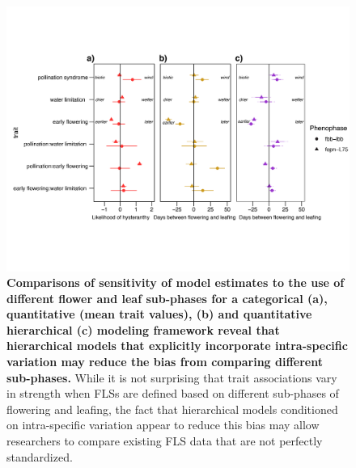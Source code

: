 \documentclass[11pt]{article}
\begin{document}
\begin{figure}[H]
\centering
\includegraphics[width=\textwidth]{..//..//HFmodelplots4SUPP-01.png} 
  \caption{\textbf{Comparisons of sensitivity of model estimates to the use of different flower and leaf sub-phases for a categorical  \textbf{(a)}, quantitative (mean trait values), \textbf{(b)} and quantitative hierarchical \textbf{(c)} modeling framework reveal that hierarchical models that explicitly incorporate intra-specific variation may reduce the bias from comparing different sub-phases.} While it is not surprising that trait associations vary in strength when FLSs are defined based on different sub-phases of flowering and leafing, the fact that hierarchical models conditioned on intra-specific variation appear to reduce this bias may allow researchers to compare existing FLS data that are not perfectly standardized.}
    \label{fig:sensitivity}
    \end{figure}
\end{document}
